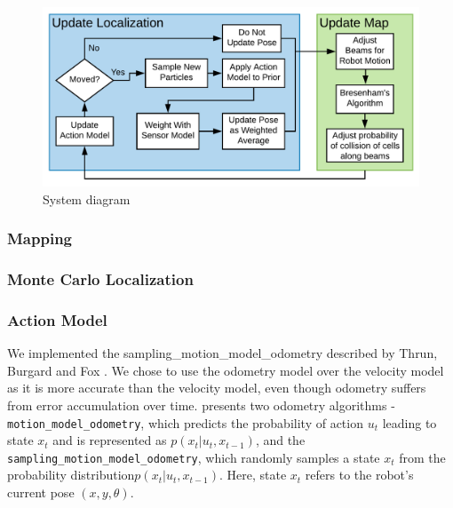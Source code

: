 \documentclass[journal]{IEEEtran}
\begin{document}
        \begin{figure}[b]
            \centering
            \includegraphics[width=1\linewidth]{slam.pdf}
            \caption{System diagram}
            \label{fig:sys}
        \end{figure}
    
        \subsubsection{Mapping}
        
        
        \subsubsection{Monte Carlo Localization}
        
        
        \subsubsection{Action Model}
            
            We implemented the sampling\_motion\_model\_odometry described by Thrun, Burgard and Fox \cite{Prob_Rob}. We chose to use the odometry model over the velocity model as it is more accurate than the velocity model, even though odometry suffers from error accumulation over time. \cite{Prob_Rob} presents two odometry algorithms - \texttt{motion\_model\_odometry}, which predicts the probability of action $u_{t}$ leading to state $x_{t}$ and is represented as $p(x_{t}|u_{t},x_{t-1})$, and the \texttt{sampling\_motion\_model\_odometry}, which randomly samples a state $x_{t}$ from the probability distribution$p(x_{t}|u_{t},x_{t-1})$. Here, state $x_{t}$ refers to the robot's current pose $(x,y,\theta)$. 
            
\end{document}
